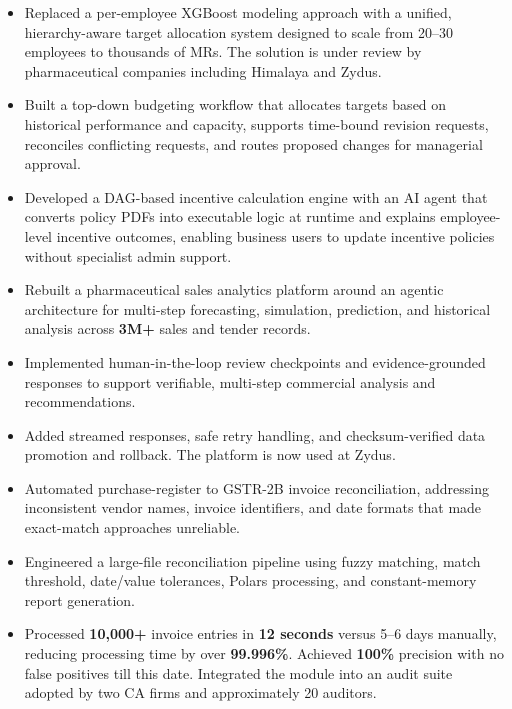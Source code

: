 \begin{itemize}
  \item Replaced a per-employee XGBoost modeling approach with a unified, hierarchy-aware target allocation system designed to scale from 20--30 employees to thousands of MRs. The solution is under review by pharmaceutical companies including Himalaya and Zydus.
  \item Built a top-down budgeting workflow that allocates targets based on historical performance and capacity, supports time-bound revision requests, reconciles conflicting requests, and routes proposed changes for managerial approval.
  \item Developed a DAG-based incentive calculation engine with an AI agent that converts policy PDFs into executable logic at runtime and explains employee-level incentive outcomes, enabling business users to update incentive policies without specialist admin support.
\end{itemize}
\begin{itemize}
  \item Rebuilt a pharmaceutical sales analytics platform around an agentic architecture for multi-step forecasting, simulation, prediction, and historical analysis across \textbf{3M+} sales and tender records.
  \item Implemented human-in-the-loop review checkpoints and evidence-grounded responses to support verifiable, multi-step commercial analysis and recommendations.
  \item Added streamed responses, safe retry handling, and checksum-verified data promotion and rollback. The platform is now used at Zydus.
\end{itemize}
\entrydivider
{}
\begin{itemize}
  \item Automated purchase-register to GSTR-2B invoice reconciliation, addressing inconsistent vendor names, invoice identifiers, and date formats that made exact-match approaches unreliable.
  \item Engineered a large-file reconciliation pipeline using fuzzy matching, match threshold, date/value tolerances, Polars processing, and constant-memory report generation.
  \item Processed \textbf{10,000+} invoice entries in \textbf{12 seconds} versus 5--6 days manually, reducing processing time by over \textbf{99.996\%}. Achieved \textbf{100\%} precision with no false positives till this date. Integrated the module into an audit suite adopted by two CA firms and approximately 20 auditors.
\end{itemize}
